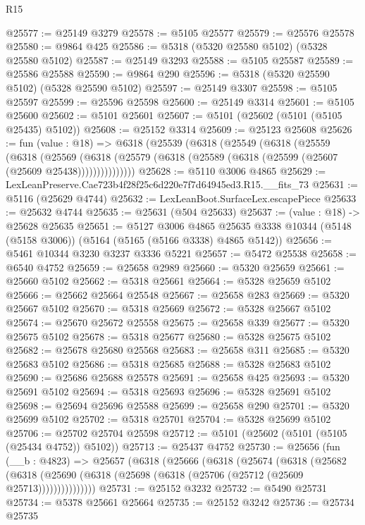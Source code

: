 \begin{lexlean}{R15}
\begin{coremodule}
{{{{{{{{{{{@25577 := @25149 @3279
@25578 := @5105 @25577
@25579 := @25576 @25578
@25580 := @9864 @425
@25586 := @5318 (@5320 @25580 @5102) (@5328 @25580 @5102)
@25587 := @25149 @3293
@25588 := @5105 @25587
@25589 := @25586 @25588
@25590 := @9864 @290
@25596 := @5318 (@5320 @25590 @5102) (@5328 @25590 @5102)
@25597 := @25149 @3307
@25598 := @5105 @25597
@25599 := @25596 @25598
@25600 := @25149 @3314
@25601 := @5105 @25600
@25602 := @5101 @25601
@25607 := @5101 (@25602 (@5101 (@5105 @25435) @5102))
@25608 := @25152 @3314
@25609 := @25123 @25608
@25626 := fun (value : @18) =>
  @6318
    (@25539
      (@6318
        (@25549
          (@6318
            (@25559
              (@6318
                (@25569
                  (@6318 (@25579 (@6318 (@25589 (@6318 (@25599 (@25607 (@25609 @25438)))))))))))))))
@25628 := @5110 @3006 @4865
@25629 := LexLeanPreserve.Cae723b4f28f25c6d220e7f7d64945ed3.R15.__fits_73
@25631 := @5116 (@25629 @4744)
@25632 := LexLeanBoot.SurfaceLex.escapePiece
@25633 := @25632 @4744
@25635 := @25631 (@504 @25633)
@25637 := (value : @18) -> @25628 @25635
@25651 := @5127
    @3006
    @4865
    @25635
    @3338
    @10344
    (@5148 (@5158 @3006))
    (@5164 (@5165 (@5166 @3338) @4865 @5142))
@25656 := @5461 @10344 @3230 @3237 @3336 @5221
@25657 := @5472 @25538
@25658 := @6540 @4752
@25659 := @25658 @2989
@25660 := @5320 @25659
@25661 := @25660 @5102
@25662 := @5318 @25661
@25664 := @5328 @25659 @5102
@25666 := @25662 @25664 @25548
@25667 := @25658 @283
@25669 := @5320 @25667 @5102
@25670 := @5318 @25669
@25672 := @5328 @25667 @5102
@25674 := @25670 @25672 @25558
@25675 := @25658 @339
@25677 := @5320 @25675 @5102
@25678 := @5318 @25677
@25680 := @5328 @25675 @5102
@25682 := @25678 @25680 @25568
@25683 := @25658 @311
@25685 := @5320 @25683 @5102
@25686 := @5318 @25685
@25688 := @5328 @25683 @5102
@25690 := @25686 @25688 @25578
@25691 := @25658 @425
@25693 := @5320 @25691 @5102
@25694 := @5318 @25693
@25696 := @5328 @25691 @5102
@25698 := @25694 @25696 @25588
@25699 := @25658 @290
@25701 := @5320 @25699 @5102
@25702 := @5318 @25701
@25704 := @5328 @25699 @5102
@25706 := @25702 @25704 @25598
@25712 := @5101 (@25602 (@5101 (@5105 (@25434 @4752)) @5102))
@25713 := @25437 @4752
@25730 := @25656
    (fun (__b : @4823) =>
    @25657
      (@6318
        (@25666
          (@6318
            (@25674
              (@6318
                (@25682
                  (@6318 (@25690 (@6318 (@25698 (@6318 (@25706 (@25712 (@25609 @25713)))))))))))))))
@25731 := @25152 @3232
@25732 := @5490 @25731
@25734 := @5378 @25661 @25664
@25735 := @25152 @3242
@25736 := @25734 @25735
}}}}}}}}}}}
\end{coremodule}
\end{lexlean}
